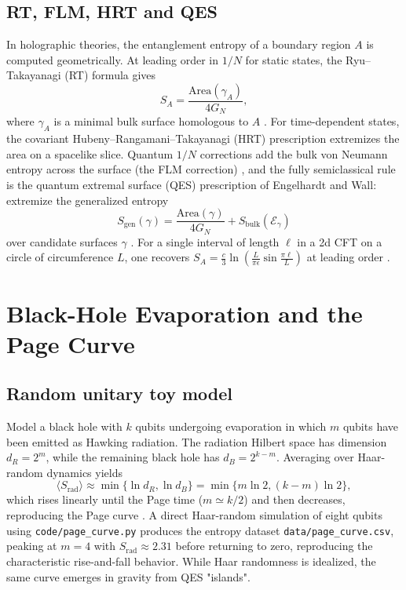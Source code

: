 \documentclass[12pt, numbers, sort&compress]{article}
\begin{document}
\subsection{RT, FLM, HRT and QES}
In holographic theories, the entanglement entropy of a boundary region $A$ is computed geometrically. At leading order in $1/N$ for static states, the Ryu–Takayanagi (RT) formula gives
\begin{equation}
S_A = \frac{\mathrm{Area}(\gamma_A)}{4G_N},
\end{equation}
where $\gamma_A$ is a minimal bulk surface homologous to $A$ \cite{Ryu:2006prl}. For time-dependent states, the covariant Hubeny–Rangamani–Takayanagi (HRT) prescription extremizes the area on a spacelike slice. Quantum $1/N$ corrections add the bulk von Neumann entropy across the surface (the FLM correction) \cite{Faulkner:2013FLM}, and the fully semiclassical rule is the quantum extremal surface (QES) prescription of Engelhardt and Wall: extremize the generalized entropy
\begin{equation}
S_{\text{gen}}(\gamma) = \frac{\mathrm{Area}(\gamma)}{4G_N} + S_{\text{bulk}}(\mathcal{E}_\gamma)
\label{QES}
\end{equation}
over candidate surfaces $\gamma$ \cite{EngelhardtWall:2015QES}. For a single interval of length $\ell$ in a 2d CFT on a circle of circumference $L$, one recovers $S_A = \frac{c}{3}\ln\left(\frac{L}{\pi\epsilon}\sin\frac{\pi\ell}{L}\right)$ at leading order \cite{Ryu:2006prl}.

\section{Black-Hole Evaporation and the Page Curve}

\subsection{Random unitary toy model}
Model a black hole with $k$ qubits undergoing evaporation in which $m$ qubits have been emitted as Hawking radiation. The radiation Hilbert space has dimension $d_R=2^m$, while the remaining black hole has $d_B=2^{k-m}$. Averaging over Haar-random dynamics yields
\begin{equation}
\langle S_{\text{rad}}\rangle \approx \min\{\ln d_R, \ln d_B\} = \min\{m\ln 2, (k-m)\ln 2\},
\end{equation}
which rises linearly until the Page time ($m\simeq k/2$) and then decreases, reproducing the Page curve \cite{Page:1993prl}. A direct Haar-random simulation of eight qubits using \texttt{code/page\_curve.py} produces the entropy dataset \texttt{data/page\_curve.csv}, peaking at $m=4$ with $S_{\text{rad}}\approx2.31$ before returning to zero, reproducing the characteristic rise-and-fall behavior. While Haar randomness is idealized, the same curve emerges in gravity from QES "islands".
\end{document}
